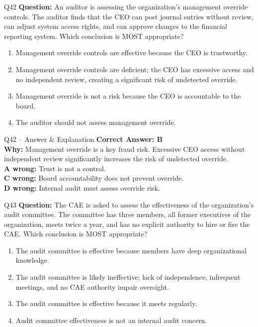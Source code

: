 \documentclass[aspectratio=169,10pt]{beamer}
\begin{document}
	\begin{frame}[t]{Q42}
		\small
		\textbf{Question:} An auditor is assessing the organization's management override controls. The auditor finds that the CEO can post journal entries without review, can adjust system access rights, and can approve changes to the financial reporting system. Which conclusion is MOST appropriate?
		\begin{enumerate}[label=\Alph*.,itemsep=1pt,topsep=2pt]
			\item Management override controls are effective because the CEO is trustworthy.
			\item Management override controls are deficient; the CEO has excessive access and no independent review, creating a significant risk of undetected override.
			\item Management override is not a risk because the CEO is accountable to the board.
			\item The auditor should not assess management override.
		\end{enumerate}
	\end{frame}
	
	\begin{frame}[t]{Q42 -- Answer \& Explanation}
		\small
		\textbf{Correct Answer: B} \\[4pt]
		\textbf{Why:} Management override is a key fraud risk. Excessive CEO access without independent review significantly increases the risk of undetected override. \\[4pt]
		\textbf{A wrong:} Trust is not a control. \\[2pt]
		\textbf{C wrong:} Board accountability does not prevent override. \\[2pt]
		\textbf{D wrong:} Internal audit must assess override risk.
	\end{frame}
	
	\begin{frame}[t]{Q43}
		\small
		\textbf{Question:} The CAE is asked to assess the effectiveness of the organization's audit committee. The committee has three members, all former executives of the organization, meets twice a year, and has no explicit authority to hire or fire the CAE. Which conclusion is MOST appropriate?
		\begin{enumerate}[label=\Alph*.,itemsep=1pt,topsep=2pt]
			\item The audit committee is effective because members have deep organizational knowledge.
			\item The audit committee is likely ineffective; lack of independence, infrequent meetings, and no CAE authority impair oversight.
			\item The audit committee is effective because it meets regularly.
			\item Audit committee effectiveness is not an internal audit concern.
		\end{enumerate}
	\end{frame}
	
\end{document}
